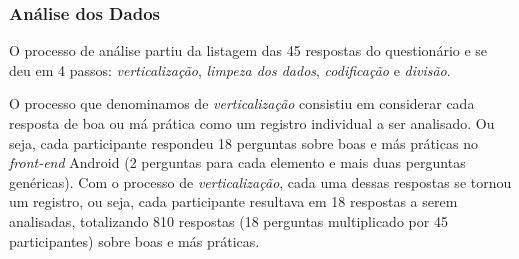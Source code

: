 


\subsubsection{Análise dos Dados}
\label{sub:smells-definition}

O processo de análise partiu da listagem das 45 respostas do questionário e se deu em 4 passos: \textit{verticalização}, \textit{limpeza dos dados}, \textit{codificação} e \textit{divisão}.

O processo que denominamos de \textit{verticalização} consistiu em considerar cada resposta de boa ou má prática como um registro individual a ser analisado. Ou seja, cada participante respondeu 18 perguntas sobre boas e más práticas no \textit{front-end} Android (2 perguntas para cada elemento e mais duas perguntas genéricas). Com o processo de \textit{verticalização}, cada uma dessas respostas se tornou um registro, ou seja, cada participante resultava em 18 respostas a serem analisadas, totalizando 810 respostas (18 perguntas multiplicado por 45 participantes) sobre boas e más práticas.

